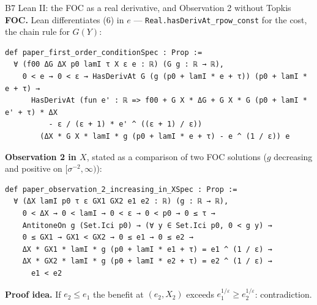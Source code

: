\documentclass[aspectratio=169,11pt]{beamer}
\begin{document}
\begin{frame}[fragile]{B7 \textperiodcentered{} Lean II: the FOC as a real derivative, and Observation 2 without Topkis}
  \small\textbf{FOC.} Lean differentiates (6) in $e$ --- \texttt{Real.hasDerivAt\_rpow\_const} for the cost, the chain rule for $G(Y)$:
\begin{lstlisting}
def paper_first_order_conditionSpec : Prop :=
  ∀ (f00 ΔG ΔX p0 lamI τ X ε e : ℝ) (G g : ℝ → ℝ),
    0 < e → 0 < ε → HasDerivAt G (g (p0 + lamI * e + τ)) (p0 + lamI * e + τ) →
      HasDerivAt (fun e' : ℝ => f00 + G X * ΔG + G X * G (p0 + lamI * e' + τ) * ΔX
          - ε / (ε + 1) * e' ^ ((ε + 1) / ε))
        (ΔX * G X * lamI * g (p0 + lamI * e + τ) - e ^ (1 / ε)) e
\end{lstlisting}
  \textbf{Observation 2 in $X$}, stated as a comparison of two FOC solutions ($g$ decreasing and positive on $[\sigma^{-2},\infty)$):
\begin{lstlisting}
def paper_observation_2_increasing_in_XSpec : Prop :=
  ∀ (ΔX lamI p0 τ ε GX1 GX2 e1 e2 : ℝ) (g : ℝ → ℝ),
    0 < ΔX → 0 < lamI → 0 < ε → 0 < p0 → 0 ≤ τ →
    AntitoneOn g (Set.Ici p0) → (∀ y ∈ Set.Ici p0, 0 < g y) →
    0 ≤ GX1 → GX1 < GX2 → 0 ≤ e1 → 0 ≤ e2 →
    ΔX * GX1 * lamI * g (p0 + lamI * e1 + τ) = e1 ^ (1 / ε) →
    ΔX * GX2 * lamI * g (p0 + lamI * e2 + τ) = e2 ^ (1 / ε) →
      e1 < e2
\end{lstlisting}
  \textbf{Proof idea.} If $e_2\le e_1$ the benefit at $(e_2,X_2)$ exceeds $e_1^{1/\varepsilon}\ge e_2^{1/\varepsilon}$: contradiction.
\end{frame}
\end{document}
